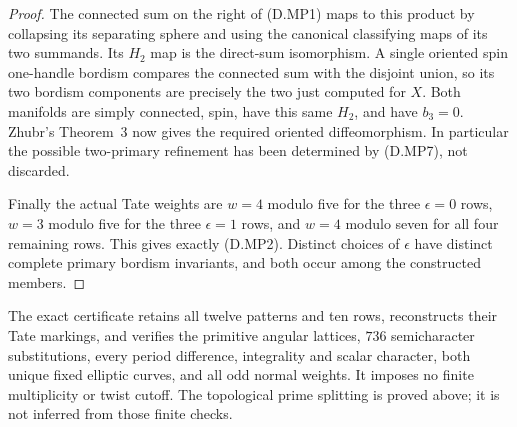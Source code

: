 \begin{proof}
The connected sum on the right of (D.MP1) maps to this product
by collapsing its separating sphere and using the canonical
classifying maps of its two summands. Its $H_2$ map is the
direct-sum isomorphism. A single oriented spin one-handle
bordism compares the connected sum with the disjoint union,
so its two bordism components are precisely the two just
computed for $X$. Both manifolds are simply connected, spin,
have this same $H_2$, and have $b_3=0$. Zhubr's Theorem~3
\cite[p.795]{manZhubr75} now gives the required oriented
diffeomorphism. In particular the possible two-primary
refinement has been determined by (D.MP7), not discarded.

Finally the actual Tate weights are $w=4$ modulo five for
the three $\epsilon=0$ rows, $w=3$ modulo five for the three
$\epsilon=1$ rows, and $w=4$ modulo seven for all four
remaining rows. This gives exactly (D.MP2). Distinct choices
of $\epsilon$ have distinct complete primary bordism
invariants, and both occur among the constructed members.
\end{proof}

The exact certificate 
retains all twelve patterns and ten rows, reconstructs their
Tate markings, and verifies the primitive angular lattices,
$736$ semicharacter substitutions, every period difference,
integrality and scalar character, both unique fixed elliptic
curves, and all odd normal weights. It imposes no finite
multiplicity or twist cutoff. The topological prime splitting
is proved above; it is not inferred from those finite checks.
